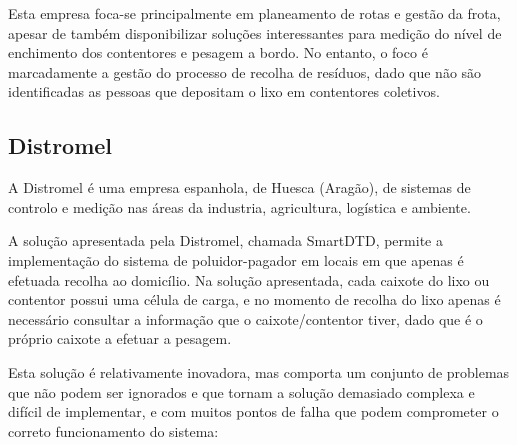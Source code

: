 \documentclass[11pt, a4paper, oneside]{book}
\begin{document}
Esta empresa foca-se principalmente em planeamento de rotas e gestão da frota, apesar de também disponibilizar soluções interessantes para medição do nível de enchimento dos contentores e pesagem a bordo. No entanto, o foco é marcadamente a gestão do processo de recolha de resíduos, dado que não são identificadas as pessoas que depositam o lixo em contentores coletivos.

\subsection{Distromel}

A Distromel é uma empresa espanhola, de Huesca (Aragão), de sistemas de controlo e medição nas áreas da industria, agricultura, logística e ambiente.

A solução apresentada pela Distromel, chamada SmartDTD, permite a implementação do sistema de poluidor-pagador em locais em que apenas é efetuada recolha ao domicílio. Na solução apresentada, cada caixote do lixo ou contentor possui uma célula de carga, e no momento de recolha do lixo apenas é necessário consultar a informação que o caixote/contentor tiver, dado que é o próprio caixote a efetuar a pesagem.

Esta solução é relativamente inovadora, mas comporta um conjunto de problemas que não podem ser ignorados e que tornam a solução demasiado complexa e difícil de implementar, e com muitos pontos de falha que podem comprometer o correto funcionamento do sistema:
\end{document}
